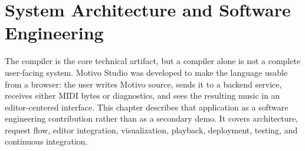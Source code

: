 \chapter{System Architecture and Software Engineering}\label{ch:studio-engineering}

The compiler is the core technical artifact, but a compiler alone is not a complete user-facing system.
Motivo Studio was developed to make the language usable from a browser: the user writes Motivo source, sends it to a
backend service, receives either MIDI bytes or diagnostics, and sees the resulting music in an editor-centered
interface.
This chapter describes that application as a software engineering contribution rather than as a secondary
demo. It covers architecture, request flow, editor integration, visualization, playback, deployment, testing,
and continuous integration.






